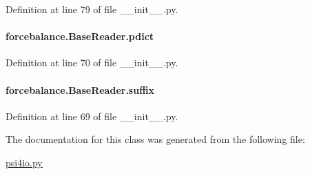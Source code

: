 Definition at line 79 of file \-\_\-\-\_\-init\-\_\-\-\_\-.\-py.

\hypertarget{classforcebalance_1_1BaseReader_aaf18c900d6055ed4b5124f6bb26164c1}{
\paragraph[{pdict}]{\setlength{\rightskip}{0pt plus 5cm}forcebalance.\-Base\-Reader.\-pdict\hspace{0.3cm}{\ttfamily [inherited]}}}\label{classforcebalance_1_1BaseReader_aaf18c900d6055ed4b5124f6bb26164c1}


Definition at line 70 of file \-\_\-\-\_\-init\-\_\-\-\_\-.\-py.

\hypertarget{classforcebalance_1_1BaseReader_a48ef0584a1b6b4b6f8eb741ad8465db8}{
\paragraph[{suffix}]{\setlength{\rightskip}{0pt plus 5cm}forcebalance.\-Base\-Reader.\-suffix\hspace{0.3cm}{\ttfamily [inherited]}}}\label{classforcebalance_1_1BaseReader_a48ef0584a1b6b4b6f8eb741ad8465db8}


Definition at line 69 of file \-\_\-\-\_\-init\-\_\-\-\_\-.\-py.



The documentation for this class was generated from the following file\-:\begin{DoxyCompactItemize}
\item 
\hyperlink{psi4io_8py}{psi4io.\-py}\end{DoxyCompactItemize}

